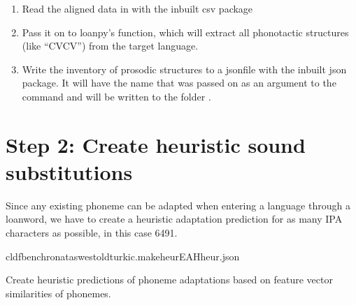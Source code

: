 \documentclass[letterpaper,10pt,english]{sphinxmanual}
\begin{document}
\begin{fulllineitems}
\label{\detokenize{mkloanpy:ronataswestoldturkiccommands.mineEAHinvs.run}}
\pysigstartsignatures
{}
\pysigstopsignatures\begin{enumerate}
%
\item {} 
\sphinxAtStartPar
Read the aligned data in  with the
inbuilt csv package

\item {} 
\sphinxAtStartPar
Pass it on to loanpy’s 
function, which will extract all phonotactic structures (like “CVCV”)
from the target language.

\item {} 
\sphinxAtStartPar
Write the inventory of prosodic structures to a json\sphinxhyphen{}file with the
inbuilt json package. It will have the name that was passed on as an
argument to the command and will be written to the folder .

\end{enumerate}

\end{fulllineitems}



\section{Step 2: Create heuristic sound substitutions}
\label{\detokenize{mkloanpy:step-2-create-heuristic-sound-substitutions}}
\sphinxAtStartPar
Since any existing phoneme can be adapted when entering a language through
a loanword, we have to create a heuristic adaptation prediction for as many
IPA characters as possible, in this case 6491.

\begin{sphinxVerbatim}[commandchars=\\\{\}]
cldfbenchronataswestoldturkic.makeheurEAHheur.json
\end{sphinxVerbatim}
\label{\detokenize{mkloanpy:module-ronataswestoldturkiccommands.makeheur}}
\sphinxAtStartPar
Create heuristic predictions of phoneme adaptations based on feature vector
similarities of phonemes.
\end{document}
